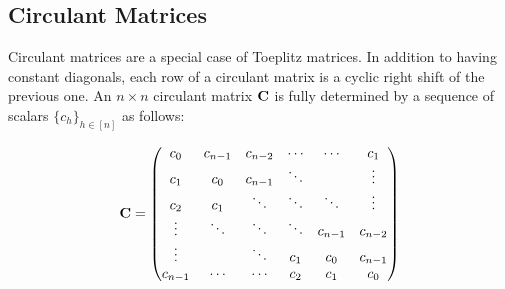 \subsection{Circulant Matrices}
\label{subsection:ch2-circulant_matrices}

Circulant matrices are a special case of Toeplitz matrices.
In addition to having constant diagonals, each row of a circulant matrix is a cyclic right shift of the previous one.
An $n \times n$ circulant matrix $\mathbf{C}$ is fully determined by a sequence of scalars $\{c_h\}_{h \in [n]}$ as follows:

\begin{equation}
  \mathbf{C} =
  \begin{pmatrix}
    c_0 & c_{n-1} & c_{n-2} & \cdots & \cdots & c_{1} \\
    c_{1} & c_0 & c_{n-1} & \ddots & & \vdots \\
    c_{2} & c_{1} & \ddots & \ddots & \ddots & \vdots \\ 
    \vdots & \ddots & \ddots & \ddots & c_{n-1} & c_{n-2} \\
    \vdots & & \ddots & c_{1} & c_{0} & c_{n-1} \\
    c_{n-1} & \cdots & \cdots & c_{2} & c_{1} & c_0
  \end{pmatrix}
\end{equation}

